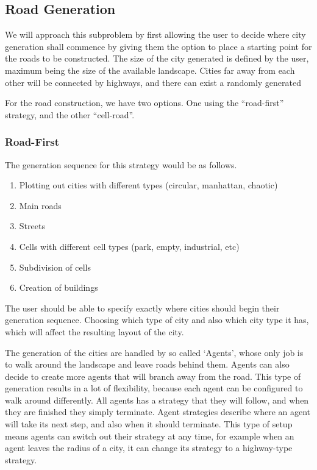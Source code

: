 \subsection{Road Generation}
We will approach this subproblem by first allowing the user to decide where city generation shall commence by giving them the option to place a starting point for the roads to be constructed.
The size of the city generated is defined by the user, maximum being the size of the available landscape.
Cities far away from each other will be connected by highways, and there can exist a randomly generated 

For the road construction, we have two options.
One using the “road-first” strategy, and the other “cell-road”.

\subsubsection{Road-First}
The generation sequence for this strategy would be as follows.
\begin{enumerate}
  \item Plotting out cities with different types (circular, manhattan, chaotic)
  \item Main roads
  \item Streets
  \item Cells with different cell types (park, empty, industrial, etc)
  \item Subdivision of cells
  \item Creation of buildings
\end{enumerate}

The user should be able to specify exactly where cities should begin their generation sequence.
Choosing which type of city
and also which city type it has, which will affect the resulting layout of the city.

The generation of the cities are handled by so called `Agents', whose only job is to walk around the landscape and leave roads behind them.
Agents can also decide to create more agents that will branch away from the road.
This type of generation results in a lot of flexibility, because each agent can be configured to walk around differently.
All agents has a strategy that they will follow, and when they are finished they simply terminate.
Agent strategies describe where an agent will take its next step, and also when it should terminate.
This type of setup means agents can switch out their strategy at any time, for example when an agent leaves the radius of a city, it can change its strategy to a highway-type strategy.

